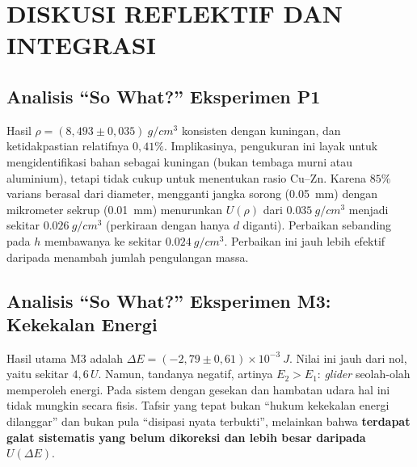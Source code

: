 \documentclass[a4paper, 12pt]{article}
\begin{document}
\section{DISKUSI REFLEKTIF DAN INTEGRASI}
        \subsection{Analisis ``So What?'' Eksperimen P1}
        Hasil $\rho=(8{,}493\pm0{,}035)\ \si{g/cm^3}$ konsisten dengan kuningan, dan ketidakpastian relatifnya $0{,}41\%$. Implikasinya, pengukuran ini layak untuk mengidentifikasi bahan sebagai kuningan (bukan tembaga murni atau aluminium), tetapi tidak cukup untuk menentukan rasio Cu--Zn. Karena $85\%$ varians berasal dari diameter, mengganti jangka sorong (\SI{0,05}{mm}) dengan mikrometer sekrup (\SI{0,01}{mm}) menurunkan $U(\rho)$ dari $\SI{0,035}{g/cm^3}$ menjadi sekitar $\SI{0,026}{g/cm^3}$ (perkiraan dengan hanya $d$ diganti). Perbaikan sebanding pada $h$ membawanya ke sekitar $\SI{0,024}{g/cm^3}$. Perbaikan ini jauh lebih efektif daripada menambah jumlah pengulangan massa.

        \subsection{Analisis ``So What?'' Eksperimen M3: Kekekalan Energi}
        Hasil utama M3 adalah $\Delta E=(-2{,}79\pm0{,}61)\times10^{-3}\ \si{J}$. Nilai ini jauh dari nol, yaitu sekitar $4{,}6\,U$. Namun, tandanya negatif, artinya $E_2>E_1$: \textit{glider} seolah-olah memperoleh energi. Pada sistem dengan gesekan dan hambatan udara hal ini tidak mungkin secara fisis. Tafsir yang tepat bukan ``hukum kekekalan energi dilanggar'' dan bukan pula ``disipasi nyata terbukti'', melainkan bahwa \textbf{terdapat galat sistematis yang belum dikoreksi dan lebih besar daripada $U(\Delta E)$}.
\end{document}
